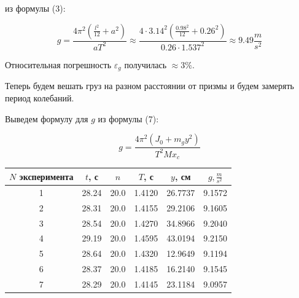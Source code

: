 \documentclass[12pt, a4paper]{article}
\begin{document}
из формулы (3):

\[g = \frac{4\pi^2(\frac{l^2}{12} + a^2)}{aT^2} \approx
\frac{4 \cdot 3.14^2(\frac{0.98^2}{12} + 0.26^2)}{0.26 \cdot 1.537^2}
\approx 9.49 \frac{m}{s^2}\]

Относительная погрешность $\varepsilon_g$ получилась $\approx 3\%$.

Теперь будем вешать груз на разном расстоянии от призмы и будем замерять
период колебаний.

Выведем формулу для $g$ из формулы (7):

\begin{equation}
    g = \frac{4\pi^2(J_0 + m_gy^2)}{T^2Mx_c}
\end{equation}

\begin{center}
    \begin{tabular}{|c|c|c|c|c|c|}
        \hline

        $N$ эксперимента & $t$, с & $n$ & $T$, с & $y$, см & $g, \frac{m}{s^2}$ \\
        
        \hline

        1 & 28.24 & 20.0 & 1.4120 & 26.7737 & 9.1572 \\

        \hline

        2 & 28.31 & 20.0 & 1.4155 & 29.2106 & 9.1605 \\

        \hline

        3 & 28.54 & 20.0 & 1.4270 & 34.8966 & 9.2040 \\

        \hline

        4 & 29.19 & 20.0 & 1.4595 & 43.0194 & 9.2150 \\

        \hline

        5 & 28.64 & 20.0 & 1.4320 & 12.9649 & 9.1194 \\

        \hline

        6 & 28.37 & 20.0 & 1.4185 & 16.2140 & 9.1545 \\

        \hline

        7 & 28.29 & 20.0 & 1.4145 & 23.1184 & 9.0957 \\


        \hline
    \end{tabular}
\end{center}
\end{document}

